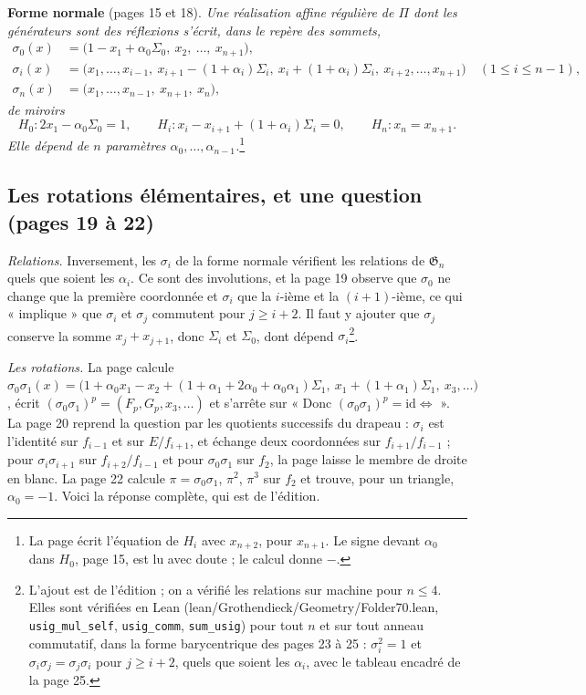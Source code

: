 \documentclass[11pt,a4paper]{article}
\begin{document}
\textbf{Forme normale} (pages 15 et 18). \emph{Une réalisation affine régulière
de $\Pi$ dont les générateurs sont des réflexions s'écrit, dans le repère des
sommets,}
\[
\begin{aligned}
\sigma_0(x) &= \bigl(1 - x_1 + \alpha_0\Sigma_0,\ x_2,\ \dots,\ x_{n+1}\bigr), \\
\sigma_i(x) &= \bigl(x_1, \dots, x_{i-1},\ x_{i+1} - (1 + \alpha_i)\Sigma_i,\
x_i + (1 + \alpha_i)\Sigma_i,\ x_{i+2}, \dots, x_{n+1}\bigr) \quad (1 \leq i
\leq n-1), \\
\sigma_n(x) &= \bigl(x_1, \dots, x_{n-1},\ x_{n+1},\ x_n\bigr),
\end{aligned}
\]
\emph{de miroirs}
\[
H_0 : 2x_1 - \alpha_0\Sigma_0 = 1, \qquad
H_i : x_i - x_{i+1} + (1 + \alpha_i)\Sigma_i = 0, \qquad
H_n : x_n = x_{n+1} .
\]
\emph{Elle dépend de $n$ paramètres $\alpha_0, \dots, \alpha_{n-1}$.}\footnote{La
page écrit l'équation de $H_i$ avec $x_{n+2}$, pour $x_{n+1}$. Le signe devant
$\alpha_0$ dans $H_0$, page 15, est lu avec doute ; le calcul donne $-$.}

\subsection*{Les rotations élémentaires, et une question (pages 19 à 22)}

\emph{Relations.} Inversement, les $\sigma_i$ de la forme normale vérifient les
relations de $\mathfrak{G}_n$ quels que soient les $\alpha_i$. Ce sont des
involutions, et la page 19 observe que $\sigma_0$ ne change que la première
coordonnée et $\sigma_i$ que la $i$-ième et la $(i+1)$-ième, ce qui
« implique » que $\sigma_i$ et $\sigma_j$ commutent pour $j \geq i + 2$. Il faut
y ajouter que $\sigma_j$ conserve la somme $x_j + x_{j+1}$, donc $\Sigma_i$ et
$\Sigma_0$, dont dépend $\sigma_i$\footnote{L'ajout est de l'édition ; on a
vérifié les relations sur machine pour $n \leq 4$. Elles sont vérifiées en Lean
(lean/Grothendieck/Geometry/Folder70.lean, \texttt{usig\_mul\_self},
\texttt{usig\_comm}, \texttt{sum\_usig}) pour tout $n$ et sur tout anneau
commutatif, dans la forme barycentrique des pages 23 à 25 : $\sigma_i^2 = 1$ et
$\sigma_i\sigma_j = \sigma_j\sigma_i$ pour $j \geq i + 2$, quels que soient les
$\alpha_i$, avec le tableau encadré de la page 25.}.

\emph{Les rotations.} La page calcule $\sigma_0\sigma_1(x) = \bigl(1 + \alpha_0
x_1 - x_2 + (1 + \alpha_1 + 2\alpha_0 + \alpha_0\alpha_1)\Sigma_1,\ x_1 + (1 +
\alpha_1)\Sigma_1,\ x_3, \dots\bigr)$, écrit $(\sigma_0\sigma_1)^p = (F_p, G_p,
x_3, \dots)$ et s'arrête sur « Donc $(\sigma_0\sigma_1)^p = \mathrm{id} \iff$ ».
La page 20 reprend la question par les quotients successifs du drapeau :
$\sigma_i$ est l'identité sur $f_{i-1}$ et sur $E / f_{i+1}$, et échange deux
coordonnées sur $f_{i+1} / f_{i-1}$ ; pour $\sigma_i\sigma_{i+1}$ sur $f_{i+2} /
f_{i-1}$ et pour $\sigma_0\sigma_1$ sur $f_2$, la page laisse le membre de droite
en blanc. La page 22 calcule $\pi = \sigma_0\sigma_1$, $\pi^2$, $\pi^3$ sur
$f_2$ et trouve, pour un triangle, $\alpha_0 = -1$. Voici la réponse
complète, qui est de l'édition.
\end{document}
